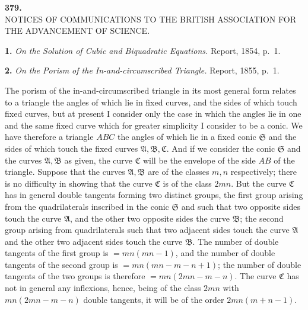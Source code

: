 \documentclass[11pt]{article}
\begin{document}
\bigskip

\begin{center}\textbf{379.}\\[2pt]
NOTICES OF COMMUNICATIONS TO THE BRITISH ASSOCIATION FOR THE ADVANCEMENT OF SCIENCE.\end{center}


\medskip

\noindent\textbf{1.} \emph{On the Solution of Cubic and Biquadratic Equations.} Report, 1854, p.~1.

\medskip

\noindent\textbf{2.} \emph{On the Porism of the In-and-circumscribed Triangle.} Report, 1855, p.~1.

\medskip

The porism of the in-and-circumscribed triangle in its most general form relates to a triangle the angles of which lie in fixed curves, and the sides of which touch fixed curves, but at present I consider only the case in which the angles lie in one and the same fixed curve which for greater simplicity I consider to be a conic. We have therefore a triangle $ABC$ the angles of which lie in a fixed conic $\mathfrak{S}$ and the sides of which touch the fixed curves $\mathfrak{A}, \mathfrak{B}, \mathfrak{C}$. And if we consider the conic $\mathfrak{S}$ and the curves $\mathfrak{A}, \mathfrak{B}$ as given, the curve $\mathfrak{C}$ will be the envelope of the side $AB$ of the triangle. Suppose that the curves $\mathfrak{A}, \mathfrak{B}$ are of the classes $m, n$ respectively; there is no difficulty in showing that the curve $\mathfrak{C}$ is of the class $2mn$. But the curve $\mathfrak{C}$ has in general double tangents forming two distinct groups, the first group arising from the quadrilaterals inscribed in the conic $\mathfrak{S}$ and such that two opposite sides touch the curve $\mathfrak{A}$, and the other two opposite sides the curve $\mathfrak{B}$; the second group arising from quadrilaterals such that two adjacent sides touch the curve $\mathfrak{A}$ and the other two adjacent sides touch the curve $\mathfrak{B}$. The number of double tangents of the first group is $= mn(mn - 1)$, and the number of double tangents of the second group is $= mn(mn - m - n + 1)$; the number of double tangents of the two groups is therefore $= mn(2mn - m - n)$. The curve $\mathfrak{C}$ has not in general any inflexions, hence, being of the class $2mn$ with $mn(2mn - m - n)$ double tangents, it will be of the order $2mn(m + n - 1)$.
\end{document}
